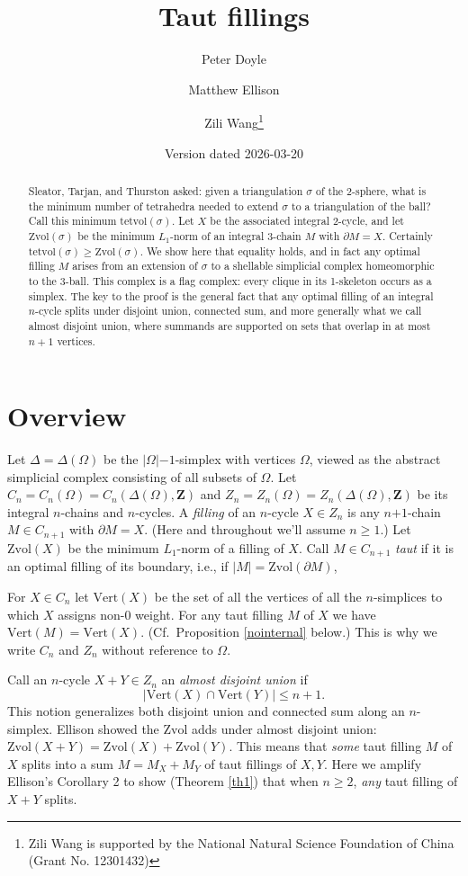 \documentclass[12pt]{article}
\title{Taut fillings}
\author{Peter Doyle \and Matthew Ellison \and Zili Wang\thanks{
Zili Wang is supported by
the National Natural Science Foundation of China (Grant No. 12301432)
}}
\date{Version dated 2026-03-20
}
\def\ZZ{\mathbf{Z}}
\def\del{\partial}
\newcommand{\kw}{\mathrm}
\newcommand{\vertices}{\kw{Vert}}
\newcommand{\Zvol}{\kw{Zvol}}
\newcommand{\tetvol}{\kw{tetvol}}
\newcommand{\pls}{\mathord{+}}
\newcommand{\mns}{\mathord{-}}
\begin{document}
\maketitle

\begin{abstract}
Sleator, Tarjan, and Thurston asked:
given a triangulation $\sigma$ of the 2-sphere,
what is the minimum number of tetrahedra needed to 
extend $\sigma$ to a triangulation of the ball?
Call this minimum $\tetvol(\sigma)$.
Let $X$ be the associated integral 2-cycle,
and let $\Zvol(\sigma)$ be the minimum $L_1$-norm
of an integral 3-chain $M$
with $\del M = X$.
Certainly $\tetvol(\sigma) \geq \Zvol(\sigma)$.
We show here that equality holds, and in fact
any optimal filling $M$ 
arises from an extension of $\sigma$ to
a shellable simplicial complex homeomorphic to the 3-ball.
This complex is a flag complex:
every clique in its 1-skeleton occurs as a simplex.
The key to the proof is the general
fact that any optimal filling of an integral $n$-cycle
splits under disjoint union, connected sum, and more generally
what we call almost disjoint union,
where summands are supported on sets that overlap in at most $n+1$ vertices.
\end{abstract}

\section{Overview}
Let $\Delta = \Delta(\Omega)$ be the $|\Omega|\mns 1$-simplex
with vertices $\Omega$,
viewed as the abstract simplicial complex consisting of all subsets of
$\Omega$.
Let $C_n=C_n(\Omega)=C_n(\Delta(\Omega),\ZZ)$
and $Z_n=Z_n(\Omega)=Z_n(\Delta(\Omega),\ZZ)$
be its integral $n$-chains and $n$-cycles.
A \emph{filling} of an $n$-cycle $X \in Z_n$ is any
$n\pls 1$-chain $M \in C_{n+1}$ with $\del M = X$.
(Here and throughout we'll assume $n\geq 1$.)
Let $\Zvol(X)$ be the minimum $L_1$-norm of a filling of $X$.
Call $M \in C_{n+1}$ \emph{taut} if it is an optimal filling
of its boundary, i.e., if $|M|=\Zvol(\del M)$,

For $X \in C_n$ let
$\vertices(X)$ be the set of all the vertices of all the $n$-simplices
to which $X$ assigns non-$0$ weight.
For any taut filling $M$ of $X$ we have $\vertices(M) = \vertices(X)$.
(Cf.\ Proposition \ref{nointernal} below.)
This is why we write $C_n$ and $Z_n$ without reference to $\Omega$.

Call an $n$-cycle $X+Y \in Z_n$ an \emph{almost disjoint union} if
\[
|\vertices(X) \cap \vertices(Y)| \leq n+1
.
\]
This notion generalizes both disjoint union and connected sum
along an $n$-simplex.
Ellison \cite{ellison:gap}
showed the $\Zvol$ adds under almost disjoint union:
$\Zvol(X+Y) = \Zvol(X) + \Zvol(Y)$.
This means that \emph{some} taut filling $M$ of $X$ splits into a sum
$M=M_X+M_Y$ of taut fillings of $X,Y$.
Here we amplify Ellison's Corollary 2 to show (Theorem \ref{th1})
that when $n \geq 2$, \emph{any} taut filling of $X+Y$ splits.
\end{document}
